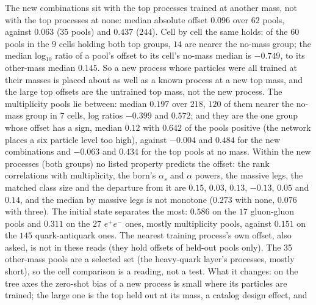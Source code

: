 \documentclass[11pt]{article}
\begin{document}
The new combinations sit with the top processes trained at another mass, not with the top processes at none: median
absolute offset $0.096$ over $62$ pools, against $0.063$ ($35$ pools) and $0.437$ ($244$). Cell by cell the same holds:
of the $60$ pools in the $9$ cells holding both top groups, $14$ are nearer the no-mass group; the median log$_{10}$
ratio of a pool's offset to its cell's no-mass median is $-0.749$, to its other-mass median $0.145$. So a new process
whose particles were all trained at their masses is placed about as well as a known process at a new top mass, and
the large top offsets are the untrained top mass, not the new process. The multiplicity pools lie between: median
$0.197$ over $218$, $120$ of them nearer the no-mass group in $7$ cells, log ratios $-0.399$ and $0.572$; and they are
the one group whose offset has a sign, median $0.12$ with $0.642$ of the pools positive (the network places a six
particle level too high), against $-0.004$ and $0.484$ for the new combinations and $-0.063$ and $0.434$ for the top
pools at no mass. Within the new processes (both groups) no listed property predicts the offset: the rank correlations
with multiplicity, the born's $\alpha_s$ and $\alpha$ powers, the massive legs, the matched class size and the departure
from it are $0.15$, $0.03$, $0.13$, $-0.13$, $0.05$ and $0.14$, and the median by massive legs is not monotone ($0.273$
with none, $0.076$ with three). The initial state separates the most: $0.586$ on the $17$ gluon-gluon pools and $0.311$
on the $27$ $e^+e^-$ ones, mostly multiplicity pools, against $0.151$ on the $145$ quark-antiquark ones.
The nearest training process's own offset, also asked, is not in these reads (they hold offsets of held-out
pools only). The 35 other-mass pools are a selected set (the heavy-quark layer's processes, mostly short), so the
cell comparison is a reading, not a test. What it changes: on the tree axes the zero-shot bias of a new process is
small where its particles are trained; the large one is the top held out at its mass, a catalog design effect, and
\end{document}
